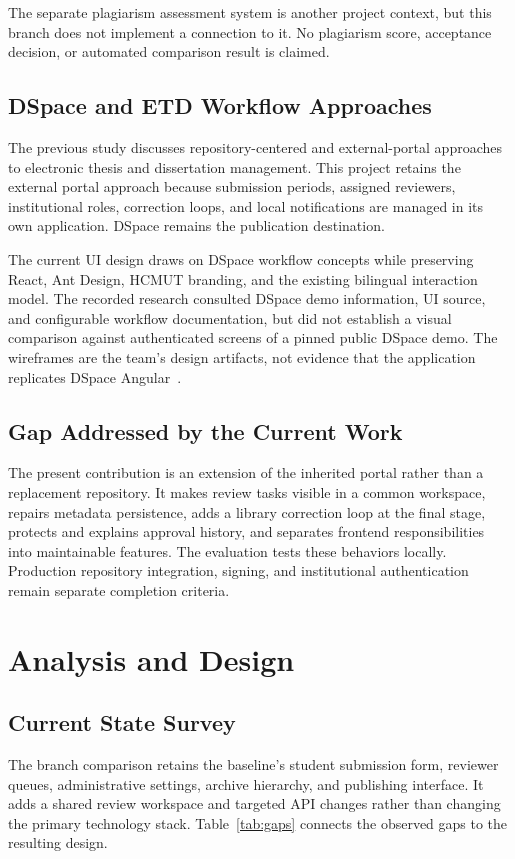 \documentclass[11pt,a4paper]{report}
\begin{document}
The separate plagiarism assessment system is another project context, but this branch does not implement a connection to it. No plagiarism score, acceptance decision, or automated comparison result is claimed.

\section{DSpace and ETD Workflow Approaches}
The previous study discusses repository-centered and external-portal approaches to electronic thesis and dissertation management. This project retains the external portal approach because submission periods, assigned reviewers, institutional roles, correction loops, and local notifications are managed in its own application. DSpace remains the publication destination.

The current UI design draws on DSpace workflow concepts while preserving React, Ant Design, HCMUT branding, and the existing bilingual interaction model. The recorded research consulted DSpace demo information, UI source, and configurable workflow documentation, but did not establish a visual comparison against authenticated screens of a pinned public DSpace demo. The wireframes are the team's design artifacts, not evidence that the application replicates DSpace Angular~\cite{ui-research}.

\section{Gap Addressed by the Current Work}
The present contribution is an extension of the inherited portal rather than a replacement repository. It makes review tasks visible in a common workspace, repairs metadata persistence, adds a library correction loop at the final stage, protects and explains approval history, and separates frontend responsibilities into maintainable features. The evaluation tests these behaviors locally. Production repository integration, signing, and institutional authentication remain separate completion criteria.

\chapter{Analysis and Design}
\label{ch:design}

\section{Current State Survey}
The branch comparison retains the baseline's student submission form, reviewer queues, administrative settings, archive hierarchy, and publishing interface. It adds a shared review workspace and targeted API changes rather than changing the primary technology stack. Table~\ref{tab:gaps} connects the observed gaps to the resulting design.
\end{document}

